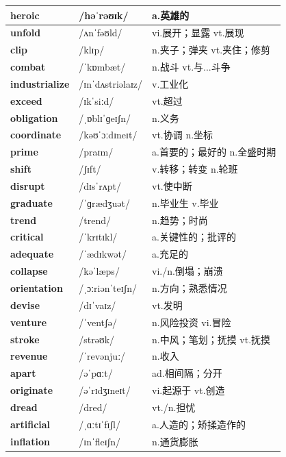 \documentclass[14pt,a4paper]{extarticle}
\begin{document}
\begin{longtable}{ p{} p{} p{} }
\textbf{heroic} & /həˈrəʊɪk/ & a.英雄的 \\ \hline
\textbf{unfold} & /ʌnˈfəʊld/ & vi.展开；显露 \quad vt.展现 \\ \hline
\textbf{clip} & /klɪp/ & n.夹子；弹夹 \quad vt.夹住；修剪 \\ \hline
\textbf{combat} & /ˈkɒmbæt/ & n.战斗 \quad vt.与...斗争 \\ \hline
\textbf{industrialize} & /ɪnˈdʌstriəlaɪz/ & v.工业化 \\ \hline
\textbf{exceed} & /ɪkˈsiːd/ & vt.超过 \\ \hline
\textbf{obligation} & /ˌɒblɪˈɡeɪʃn/ & n.义务 \\ \hline
\textbf{coordinate} & /kəʊˈɔːdɪneɪt/ & vt.协调 \quad n.坐标 \\ \hline
\textbf{prime} & /praɪm/ & a.首要的；最好的 \quad n.全盛时期 \\ \hline
\textbf{shift} & /ʃɪft/ & v.转移；转变 \quad n.轮班 \\ \hline
\textbf{disrupt} & /dɪsˈrʌpt/ & vt.使中断 \\ \hline
\textbf{graduate} & /ˈɡrædʒuət/ & n.毕业生 \quad v.毕业 \\ \hline
\textbf{trend} & /trend/ & n.趋势；时尚 \\ \hline
\textbf{critical} & /ˈkrɪtɪkl/ & a.关键性的；批评的 \\ \hline
\textbf{adequate} & /ˈædɪkwət/ & a.充足的 \\ \hline
\textbf{collapse} & /kəˈlæps/ & vi./n.倒塌；崩溃 \\ \hline
\textbf{orientation} & /ˌɔːriənˈteɪʃn/ & n.方向；熟悉情况 \\ \hline
\textbf{devise} & /dɪˈvaɪz/ & vt.发明 \\ \hline
\textbf{venture} & /ˈventʃə/ & n.风险投资 \quad vi.冒险 \\ \hline
\textbf{stroke} & /strəʊk/ & n.中风；笔划；抚摸 \quad vt.抚摸 \\ \hline
\textbf{revenue} & /ˈrevənjuː/ & n.收入 \\ \hline
\textbf{apart} & /əˈpɑːt/ & ad.相间隔；分开 \\ \hline
\textbf{originate} & /əˈrɪdʒɪneɪt/ & vi.起源于 \quad vt.创造 \\ \hline
\textbf{dread} & /dred/ & vt./n.担忧 \\ \hline
\textbf{artificial} & /ˌɑːtɪˈfɪʃl/ & a.人造的；矫揉造作的 \\ \hline
\textbf{inflation} & /ɪnˈfleɪʃn/ & n.通货膨胀 \\ \hline

\end{longtable}
\end{document}

